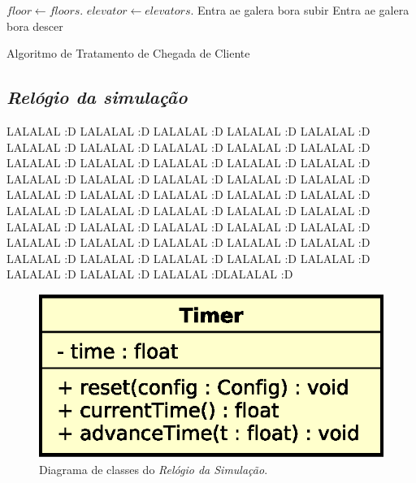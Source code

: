 \begin{description}
    \begin{algorithm}[H]
    \begin{center}
    \begin{algorithmic}[1]
      \State $floor \gets floors.$
      \State $elevator \gets elevators.$
        \State Entra ae galera bora subir
      \Else
        \State Entra ae galera bora descer
      \EndIf
    \EndFunction
    \end{algorithmic}
    \end{center}
    \caption
       {\label{alg:state:clientarrival}Algoritmo de Tratamento de Chegada de Cliente}
    \end{algorithm}

\end{description}

\subsection{\textit{Relógio da simulação}}

LALALAL :D LALALAL :D LALALAL :D LALALAL :D LALALAL :D LALALAL :D LALALAL :D
LALALAL :D LALALAL :D LALALAL :D LALALAL :D LALALAL :D LALALAL :D LALALAL :D
LALALAL :D LALALAL :D LALALAL :D LALALAL :D LALALAL :D LALALAL :D LALALAL :D
LALALAL :D LALALAL :D LALALAL :D LALALAL :D LALALAL :D LALALAL :D LALALAL :D
LALALAL :D LALALAL :D LALALAL :D LALALAL :D LALALAL :D LALALAL :D LALALAL :D
LALALAL :D LALALAL :D LALALAL :D LALALAL :D LALALAL :D LALALAL :D LALALAL :D
LALALAL :D LALALAL :D LALALAL :D LALALAL :D LALALAL :D LALALAL :DLALALAL :D

\begin{figure}[htb!]
  \centering
  \includegraphics[scale=0.6]{img/Timer.eps}
  \caption{Diagrama de classes do \textit{Relógio da Simulação}.}
\label{fig:diagram:timer}
\end{figure}

